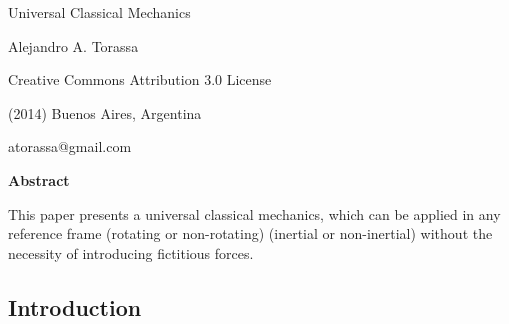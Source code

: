 \documentclass[10pt]{article}
\begin{document}
\begin{center}

{\huge Universal Classical Mechanics}

\bigskip \bigskip

{\large Alejandro A. Torassa}

\bigskip \bigskip

\small

Creative Commons Attribution 3.0 License

(2014) Buenos Aires, Argentina

atorassa@gmail.com

\bigskip \medskip

{\bf Abstract}

\bigskip

\parbox{96mm}{This paper presents a universal classical mechanics, which can be applied in any reference frame (rotating or non-rotating) (inertial or non-inertial) without the necessity of introducing fictitious forces.}

\end{center}

\normalsize

\vspace{-0.30em}

{\centering\subsection*{Introduction}}

\vspace{+1.20em}
\end{document}
